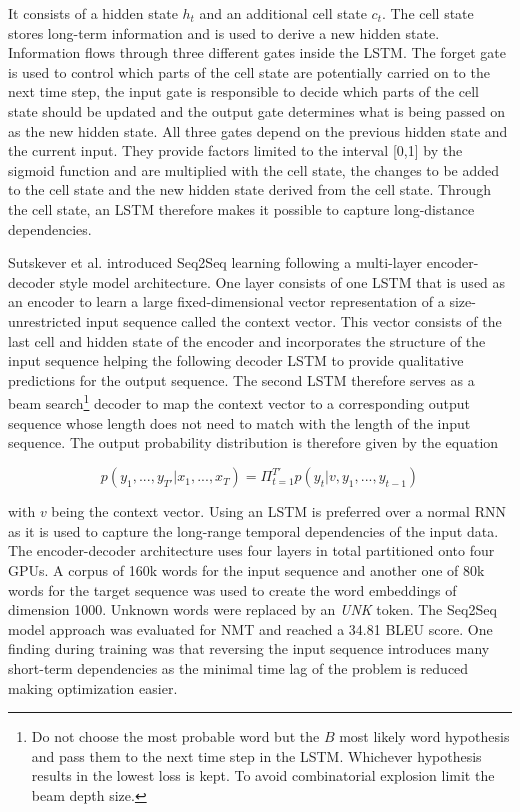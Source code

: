 It consists of a hidden state $h_t$ and an additional cell state $c_t$. The cell state stores long-term information and is used to derive a new hidden state. Information flows through three different gates inside the \ac{LSTM}. The forget gate is used to control which parts of the cell state are potentially carried on to the next time step, the input gate is responsible to decide which parts of the cell state should be updated and the output gate determines what is being passed on as the new hidden state. All three gates depend on the previous hidden state and the current input. They provide factors limited to the interval [0,1] by the sigmoid function and are multiplied with the cell state, the changes to be added to the cell state and the new hidden state derived from the cell state. Through the cell state, an \ac{LSTM} therefore makes it possible to capture long-distance dependencies. \cite{Gertz2020}

Sutskever et al. \cite{Sutskever2014} introduced \ac{Seq2Seq} learning following a multi-layer encoder-decoder style model architecture. One layer consists of one \ac{LSTM} that is used as an encoder to learn a large fixed-dimensional vector representation of a size-unrestricted input sequence called the context vector. This vector consists of the last cell and hidden state of the encoder and incorporates the structure of the input sequence helping the following decoder \ac{LSTM} to provide qualitative predictions for the output sequence. The second \ac{LSTM} therefore serves as a beam search\footnote{Do not choose the most probable word but the $B$ most likely word hypothesis and pass them to the next time step in the \ac{LSTM}. Whichever hypothesis results in the lowest loss is kept. To avoid combinatorial explosion limit the beam depth size.} decoder to map the context vector to a corresponding output sequence whose length does not need to match with the length of the input sequence. The output probability distribution is therefore given by the equation

\begin{equation}
	p(y_1, ..., y_{T'} | x_1, ..., x_{T}) = \Pi_{t=1}^{T'} p(y_t | v, y_1, ..., y_{t-1})
\end{equation}

with $v$ being the context vector. Using an \ac{LSTM} is preferred over a normal \ac{RNN} as it is used to capture the long-range temporal dependencies of the input data. The encoder-decoder architecture uses four layers in total partitioned onto four \acp{GPU}. A corpus of 160k words for the input sequence and another one of 80k words for the target sequence was used to create the word embeddings of dimension 1000. Unknown words were replaced by an \textit{UNK} token. The \ac{Seq2Seq} model approach was evaluated for \ac{NMT} and reached a 34.81 \ac{BLEU} score. One finding during training was that reversing the input sequence introduces many short-term dependencies as the minimal time lag of the problem is reduced making optimization easier. \cite{Sutskever2014}


